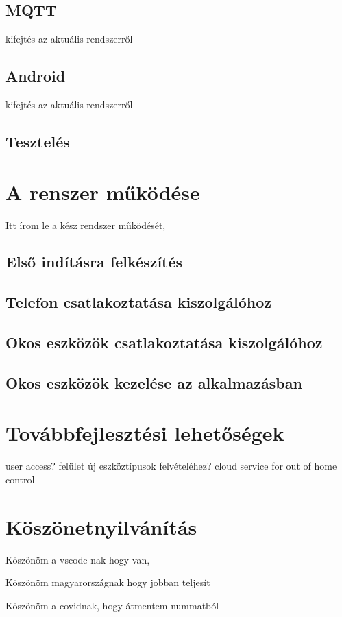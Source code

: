 \documentclass[
]{thesis-ekf}
\theoremstyle{definition}
\theoremstyle{remark}
\begin{document}
\section{MQTT}
kifejtés az aktuális rendszerről
\section{Android}
kifejtés az aktuális rendszerről
\section{Tesztelés}

\chapter{A renszer működése}
Itt írom le a kész rendszer működését, 
\section{Első indításra felkészítés}
\section{Telefon csatlakoztatása kiszolgálóhoz}
\section{Okos eszközök csatlakoztatása kiszolgálóhoz}
\section{Okos eszközök kezelése az alkalmazásban}

\chapter{Továbbfejlesztési lehetőségek}
user access? felület új eszköztípusok felvételéhez?
cloud service for out of home control

\chapter*{Köszönetnyilvánítás}
\par
Köszönöm a vscode-nak hogy van,
\par
Köszönöm magyarországnak hogy jobban teljesít
\par
Köszönöm a covidnak, hogy átmentem nummatból

\begin{thebibliography}{2}
\end{thebibliography}
\end{document}
